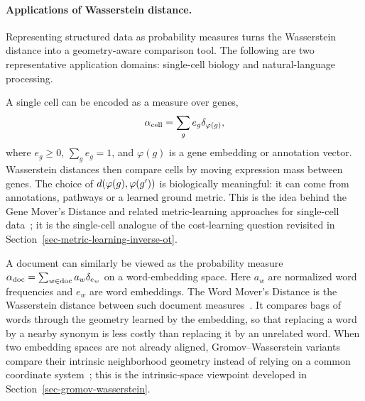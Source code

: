 \paragraph{Applications of Wasserstein distance.}

Representing structured data as probability measures turns the Wasserstein distance into a geometry-aware comparison tool. The following are two representative application domains: single-cell biology and natural-language processing.

\begin{example}\label{ex-gene-expression-distance}
	A single cell can be encoded as a measure over genes,
	\[
		\alpha_{\mathrm{cell}}=\sum_g e_g\delta_{\varphi(g)},
	\]
	where \(e_g\geq0\), \(\sum_g e_g=1\), and \(\varphi(g)\) is a gene embedding or annotation vector. Wasserstein distances then compare cells by moving expression mass between genes. The choice of \(d(\varphi(g),\varphi(g'))\) is biologically meaningful: it can come from annotations, pathways or a learned ground metric. This is the idea behind the Gene Mover's Distance and related metric-learning approaches for single-cell data~\cite{BellazziCodegoniGualandiNicoraVercesi2021GeneMover,HuizingCantiniPeyre2021WassersteinSingularVectors}; it is the single-cell analogue of the cost-learning question revisited in Section~\ref{sec-metric-learning-inverse-ot}.
\end{example}

\begin{example}\label{ex-word-mover-distance}
	A document can similarly be viewed as the probability measure
	$\alpha_{\mathrm{doc}}=\sum_{w\in\mathrm{doc}}a_w\delta_{e_w}$ on a word-embedding space.
	Here \(a_w\) are normalized word frequencies and \(e_w\) are word embeddings. The Word Mover's Distance is the Wasserstein distance between such document measures~\cite{kusner2015word}. It compares bags of words through the geometry learned by the embedding, so that replacing a word by a nearby synonym is less costly than replacing it by an unrelated word. When two embedding spaces are not already aligned, Gromov--Wasserstein variants compare their intrinsic neighborhood geometry instead of relying on a common coordinate system~\cite{AlvarezMelisJaakkola2018Gromov}; this is the intrinsic-space viewpoint developed in Section~\ref{sec-gromov-wasserstein}.
\end{example}

